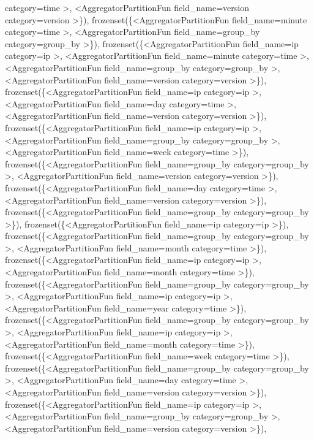 \documentclass[letterpaper,10pt,english]{sphinxmanual}
\begin{document}
\begin{fulllineitems}
\begin{fulllineitems}
category=time \textgreater{}, \textless{}AggregatorPartitionFun field\_name=version category=version \textgreater{}\}), frozenset(\{\textless{}AggregatorPartitionFun field\_name=minute category=time \textgreater{}, \textless{}AggregatorPartitionFun field\_name=group\_by category=group\_by \textgreater{}\}), frozenset(\{\textless{}AggregatorPartitionFun field\_name=ip category=ip \textgreater{}, \textless{}AggregatorPartitionFun field\_name=minute category=time \textgreater{}, \textless{}AggregatorPartitionFun field\_name=group\_by category=group\_by \textgreater{}, \textless{}AggregatorPartitionFun field\_name=version category=version \textgreater{}\}), frozenset(\{\textless{}AggregatorPartitionFun field\_name=ip category=ip \textgreater{}, \textless{}AggregatorPartitionFun field\_name=day category=time \textgreater{}, \textless{}AggregatorPartitionFun field\_name=version category=version \textgreater{}\}), frozenset(\{\textless{}AggregatorPartitionFun field\_name=ip category=ip \textgreater{}, \textless{}AggregatorPartitionFun field\_name=group\_by category=group\_by \textgreater{}, \textless{}AggregatorPartitionFun field\_name=week category=time \textgreater{}\}), frozenset(\{\textless{}AggregatorPartitionFun field\_name=group\_by category=group\_by \textgreater{}, \textless{}AggregatorPartitionFun field\_name=version category=version \textgreater{}\}), frozenset(\{\textless{}AggregatorPartitionFun field\_name=day category=time \textgreater{}, \textless{}AggregatorPartitionFun field\_name=version category=version \textgreater{}\}), frozenset(\{\textless{}AggregatorPartitionFun field\_name=group\_by category=group\_by \textgreater{}\}), frozenset(\{\textless{}AggregatorPartitionFun field\_name=ip category=ip \textgreater{}\}), frozenset(\{\textless{}AggregatorPartitionFun field\_name=group\_by category=group\_by \textgreater{}, \textless{}AggregatorPartitionFun field\_name=month category=time \textgreater{}\}), frozenset(\{\textless{}AggregatorPartitionFun field\_name=ip category=ip \textgreater{}, \textless{}AggregatorPartitionFun field\_name=month category=time \textgreater{}\}), frozenset(\{\textless{}AggregatorPartitionFun field\_name=group\_by category=group\_by \textgreater{}, \textless{}AggregatorPartitionFun field\_name=ip category=ip \textgreater{}, \textless{}AggregatorPartitionFun field\_name=year category=time \textgreater{}\}), frozenset(\{\textless{}AggregatorPartitionFun field\_name=group\_by category=group\_by \textgreater{}, \textless{}AggregatorPartitionFun field\_name=ip category=ip \textgreater{}, \textless{}AggregatorPartitionFun field\_name=month category=time \textgreater{}\}), frozenset(\{\textless{}AggregatorPartitionFun field\_name=week category=time \textgreater{}\}), frozenset(\{\textless{}AggregatorPartitionFun field\_name=group\_by category=group\_by \textgreater{}, \textless{}AggregatorPartitionFun field\_name=day category=time \textgreater{}, \textless{}AggregatorPartitionFun field\_name=version category=version \textgreater{}\}), frozenset(\{\textless{}AggregatorPartitionFun field\_name=ip category=ip \textgreater{}, \textless{}AggregatorPartitionFun field\_name=group\_by category=group\_by \textgreater{}, \textless{}AggregatorPartitionFun field\_name=version category=version \textgreater{}\}), 
\end{fulllineitems}
\end{fulllineitems}
\end{document}
